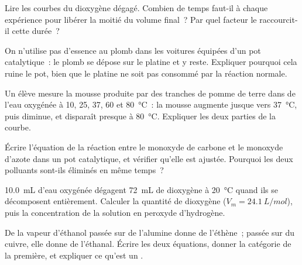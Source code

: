 \begin{exercise}[$\star\star$]\label{exo:g12:catalysis:7}
Lire les courbes du dioxygène dégagé. Combien de temps faut-il à chaque
expérience pour libérer la moitié du volume final~? Par quel facteur le
 raccourcit-il cette durée~?
\end{exercise}

\begin{exercise}[$\star\star$]\label{exo:g12:catalysis:8}
On n'utilise pas d'essence au plomb dans les voitures équipées d'un pot
catalytique~: le plomb se dépose sur le platine et y reste. Expliquer
pourquoi cela ruine le pot, bien que le platine ne soit pas consommé par
la réaction normale.
\end{exercise}

\begin{exercise}[$\star\star$]\label{exo:g12:catalysis:9}
Un élève mesure la mousse produite par des tranches de pomme de terre
dans de l'eau oxygénée à 10, 25, 37, 60 et \qty{80}{\celsius}~: la
mousse augmente jusque vers \qty{37}{\celsius}, puis diminue, et
disparaît presque à
\qty{80}{\celsius}. Expliquer les deux parties de la courbe.
\end{exercise}

\begin{exercise}[$\star\star$]\label{exo:g12:catalysis:10}
Écrire l'équation de la réaction entre le monoxyde de carbone et le
monoxyde d'azote dans un pot catalytique, et vérifier qu'elle est
ajustée. Pourquoi les deux polluants sont-ils éliminés en même temps~?
\end{exercise}

\begin{exercise}[$\star\star$]\label{exo:g12:catalysis:11}
\qty{10.0}{mL} d'eau oxygénée dégagent \qty{72}{mL} de dioxygène à
\qty{20}{\celsius} quand ils se décomposent entièrement. Calculer la
quantité de dioxygène ($V_m = \qty{24.1}{L/mol}$), puis la concentration
de la solution en peroxyde d'hydrogène.
\end{exercise}

\begin{exercise}[$\star\star\star$]\label{exo:g12:catalysis:12}
De la vapeur d'éthanol passée sur de l'alumine donne de l'éthène~;
passée sur du cuivre, elle donne de l'éthanal. Écrire les deux
équations, donner la catégorie de la première, et expliquer ce qu'est un
.
\end{exercise}

